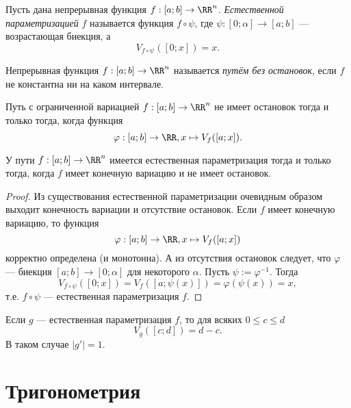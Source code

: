 \documentclass[12pt,a4paper]{article}
\begin{document}
    \begin{definition}
        Пусть дана непрерывная функция $f: [a; b] \to \RR^n$. \emph{Естественной параметризацией} $f$ называется функция $f \circ \psi$, где $\psi: [0; \alpha] \to [a; b]$ --- возрастающая биекция, а
        \[V_{f \circ \psi}([0; x]) = x.\]
    \end{definition}

    \begin{definition}
        Непрерывная функция $f: [a; b] \to \RR^n$ называется \emph{путём без остановок}, если $f$ не константна ни на каком интервале.
    \end{definition}

    \begin{lemma}
        Путь с ограниченной вариацией $f: [a; b] \to \RR^n$ не имеет остановок тогда и только тогда, когда функция
        \[\varphi: [a; b] \to \RR, x \mapsto V_f([a; x]).\]
    \end{lemma}

    \begin{theorem}
        У пути $f: [a; b] \to \RR^n$ имеется естественная параметризация тогда и только тогда, когда $f$ имеет конечную вариацию и не имеет остановок.
    \end{theorem}

    \begin{proof}
        Из существования естественной параметризации очевидным образом выходит конечность вариации и отсутствие остановок. Если $f$ имеет конечную вариацию, то функция
        \[\varphi: [a; b] \to \RR, x \mapsto V_f([a; x])\]
        корректно определена (и монотонна). А из отсутствия остановок следует, что $\varphi$ --- биекция $[a; b] \to [0; \alpha]$ для некоторого $\alpha$. Пусть $\psi := \varphi^{-1}$. Тогда
        \[V_{f \circ \psi}([0; x]) = V_f([a; \psi(x)]) = \varphi(\psi(x)) = x,\]
        т.е. $f \circ \psi$ --- естественная параметризация $f$.
    \end{proof}

    \begin{remark*}
        Если $g$ --- естественная параметризация $f$, то для всяких $0 \leqslant c \leqslant d$
        \[V_g([c; d]) = d - c.\]
        В таком случае $|g'| = 1$.
    \end{remark*}

    \section{Тригонометрия}
\end{document}
